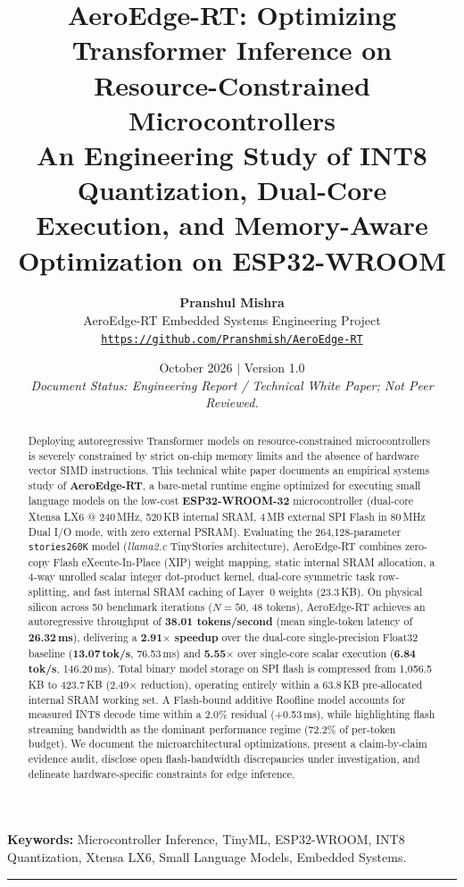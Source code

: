 \documentclass[10pt,a4paper]{article}
\title{\textbf{AeroEdge-RT: Optimizing Transformer Inference on Resource-Constrained Microcontrollers} \\
\large An Engineering Study of INT8 Quantization, Dual-Core Execution, and Memory-Aware Optimization on ESP32-WROOM}
\author{
    \textbf{Pranshul Mishra} \\
    AeroEdge-RT Embedded Systems Engineering Project \\
    \texttt{\url{https://github.com/Pranshmish/AeroEdge-RT}}
}
\date{October 2026 \quad $\vert$ \quad Version 1.0 \\
\vspace{0.8em}
\normalsize\textit{Document Status: Engineering Report / Technical White Paper; Not Peer Reviewed.}}
\begin{document}
\maketitle

\begin{abstract}
Deploying autoregressive Transformer models on resource-constrained microcontrollers is severely constrained by strict on-chip memory limits and the absence of hardware vector SIMD instructions. This technical white paper documents an empirical systems study of \textbf{AeroEdge-RT}, a bare-metal runtime engine optimized for executing small language models on the low-cost \textbf{ESP32-WROOM-32} microcontroller (dual-core Xtensa LX6 @ 240\,MHz, 520\,KB internal SRAM, 4\,MB external SPI Flash in 80\,MHz Dual I/O mode, with zero external PSRAM). Evaluating the 264,128-parameter \texttt{stories260K} model (\textit{llama2.c} TinyStories architecture), AeroEdge-RT combines zero-copy Flash eXecute-In-Place (XIP) weight mapping, static internal SRAM allocation, a 4-way unrolled scalar integer dot-product kernel, dual-core symmetric task row-splitting, and fast internal SRAM caching of Layer~0 weights (23.3\,KB). On physical silicon across 50 benchmark iterations ($N=50$, 48 tokens), AeroEdge-RT achieves an autoregressive throughput of \textbf{38.01 tokens/second} (mean single-token latency of \textbf{26.32\,ms}), delivering a \textbf{2.91$\times$ speedup} over the dual-core single-precision Float32 baseline (\textbf{13.07\,tok/s}, 76.53\,ms) and \textbf{5.55$\times$} over single-core scalar execution (\textbf{6.84\,tok/s}, 146.20\,ms). Total binary model storage on SPI flash is compressed from 1,056.5\,KB to 423.7\,KB (2.49$\times$ reduction), operating entirely within a 63.8\,KB pre-allocated internal SRAM working set. A Flash-bound additive Roofline model accounts for measured INT8 decode time within a 2.0\% residual (+0.53\,ms), while highlighting flash streaming bandwidth as the dominant performance regime (72.2\% of per-token budget). We document the microarchitectural optimizations, present a claim-by-claim evidence audit, disclose open flash-bandwidth discrepancies under investigation, and delineate hardware-specific constraints for edge inference.
\end{abstract}

\vspace{0.5em}
\noindent\textbf{Keywords:} Microcontroller Inference, TinyML, ESP32-WROOM, INT8 Quantization, Xtensa LX6, Small Language Models, Embedded Systems.

\vspace{0.8em}
\hrule
\vspace{1.0em}
\end{document}
